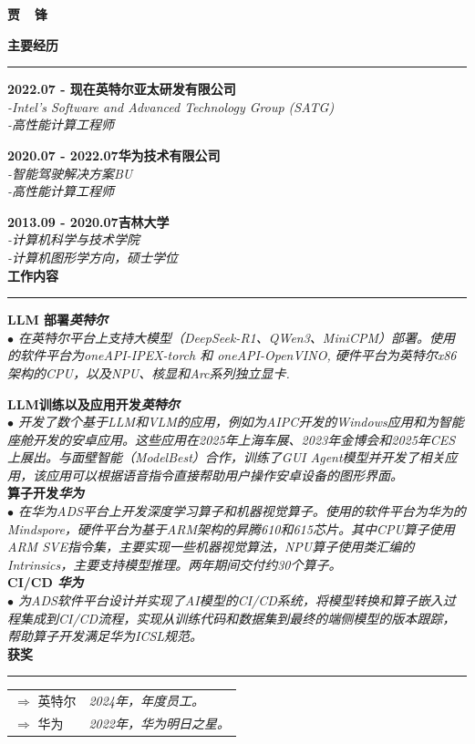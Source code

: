 \documentclass[a4paper,12pt,final]{memoir}
\newcommand{\myThemeColor}{RoyalBlue}
\newcommand{\SmallSep}{\vspace{0.9em}}
\newcommand{\CVSection}[1]
	{\Large\textbf{#1}\par
	\vspace{0.2cm}\normalsize\normalfont}
\newcommand{\CVItem}[1]
	{\textbf{\color{\myThemeColor} #1}}
\begin{document}
\Huge\bfseries {\color{\myThemeColor} 贾~~锋}\\
\normalsize\normalfont

\CVSection{主要经历}
\hrule
\SmallSep

\CVItem{2022.07 - 现在\hfill\textsc{英特尔亚太研发有限公司}}\\
\textit{-Intel's Software and Advanced Technology Group (SATG)}\\
\textit{-高性能计算工程师}

\CVItem{2020.07 - 2022.07\hfill\textsc{华为技术有限公司}}\\
\textit{-智能驾驶解决方案BU}\\
\textit{-高性能计算工程师}

\CVItem{2013.09 - 2020.07\hfill\textsc{吉林大学}}\\
\textit{-计算机科学与技术学院}\\
\textit{-计算机图形学方向，硕士学位}
\\

\CVSection{工作内容}
\hrule
\SmallSep
\CVItem{LLM 部署\hfill\emph{英特尔}}\\
\textit{$\bullet$ 在英特尔平台上支持大模型（DeepSeek-R1、QWen3、MiniCPM）部署。使用的软件平台为oneAPI-IPEX-torch 和 oneAPI-OpenVINO, 硬件平台为英特尔x86架构的CPU，以及NPU、核显和Arc系列独立显卡. }

\CVItem{LLM训练以及应用开发\hfill\emph{英特尔}}\\
\textit{$\bullet$ 
开发了数个基于LLM和VLM的应用，例如为AIPC开发的Windows应用和为智能座舱开发的安卓应用。这些应用在2025年上海车展、2023年金博会和2025年CES上展出。与面壁智能（ModelBest）合作，训练了GUI Agent模型并开发了相关应用，该应用可以根据语音指令直接帮助用户操作安卓设备的图形界面。} 
\\
\CVItem{算子开发\hfill\emph{华为}}\\
\textit{$\bullet$ 
在华为ADS平台上开发深度学习算子和机器视觉算子。使用的软件平台为华为的Mindspore，硬件平台为基于ARM架构的昇腾610和615芯片。其中CPU算子使用ARM SVE指令集，主要实现一些机器视觉算法，NPU算子使用类汇编的Intrinsics，主要支持模型推理。两年期间交付约30个算子。}
\\
\CVItem{CI/CD \hfill\emph{华为}}\\
\textit{$\bullet$ 
为ADS软件平台设计并实现了AI模型的CI/CD系统，将模型转换和算子嵌入过程集成到CI/CD流程，实现从训练代码和数据集到最终的端侧模型的版本跟踪，帮助算子开发满足华为ICSL规范。}
\\

\CVSection{获奖}
\hrule
\SmallSep
	\begin{tabular}{l|l}
		$\Rightarrow$ 英特尔&\textit{ 2024年，年度员工。}\footnotesize\\
		$\Rightarrow$ 华为&\textit{ 2022年，华为明日之星。}\\
	\end{tabular}

\end{document}
